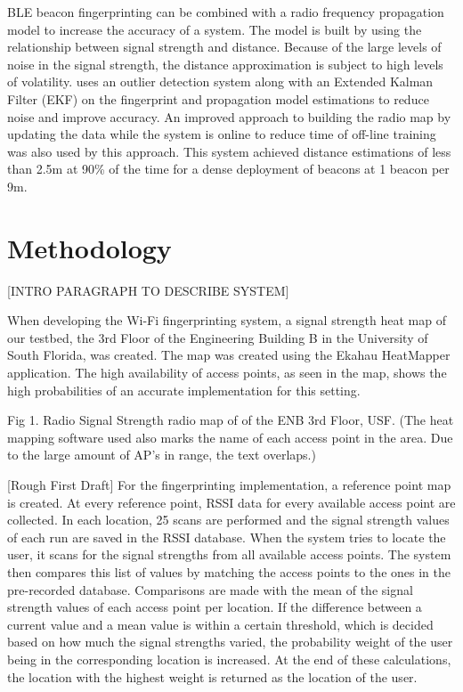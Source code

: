 \documentclass[conference]{IEEEtran}
\begin{document}
BLE beacon fingerprinting can be combined with a radio frequency propagation model to increase the accuracy of a system. The model is built by using the relationship between signal strength and distance. Because of the large levels of noise in the signal strength, the distance approximation is subject to high levels of volatility. \cite{zhuang2016smartphone} uses an outlier detection system along with an Extended Kalman Filter (EKF) on the fingerprint and propagation model estimations to reduce noise and improve accuracy. An improved approach to building the radio map by updating the data while the system is online to reduce time of off-line training was also used by this approach. This system achieved distance estimations of less than 2.5m at 90\% of the time for a dense deployment of beacons at 1 beacon per 9m.


\section{Methodology}

[INTRO PARAGRAPH TO DESCRIBE SYSTEM]

When developing the Wi-Fi fingerprinting system, a signal strength heat map of our testbed, the 3rd Floor of the Engineering Building B in the University of South Florida, was created. The map was created using the Ekahau HeatMapper application. The high availability of access points, as seen in the map, shows the high probabilities of an accurate implementation for this setting.

Fig 1. Radio Signal Strength radio map of  of the ENB 3rd Floor, USF. (The heat mapping software used also marks the name of each access point in the area. Due to the large amount of AP’s in range, the text overlaps.)

[Rough First Draft]
For the fingerprinting implementation, a reference point map is created. At every reference point, RSSI data for every available access point are collected. In each location, 25 scans are performed and the signal strength values of each run are saved in the RSSI database. When the system tries to locate the user, it scans for the signal strengths from all available access points. The system then compares this list of values by matching the access points to the ones in the pre-recorded database. Comparisons are made with the mean of the signal strength values of each access point per location. If the difference between a current value and a mean value is within a certain threshold, which is decided based on how much the signal strengths varied, the probability weight of the user being in the corresponding location is increased. At the end of these calculations, the location with the highest weight is returned as the location of the user.
\end{document}
